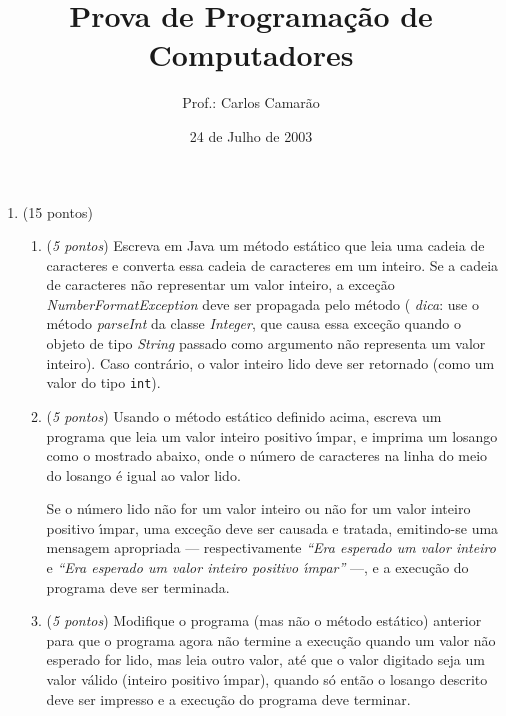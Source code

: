 \documentclass[brazil]{article}
\title{Prova de Programa\c{c}\~ao de Computadores}
\author{Prof.: Carlos Camar\~ao}
\date{24 de Julho de 2003}
\begin{document}
\maketitle

\newcommand{\prog}[1]{{\tt \begin{tabbing}
                        #1 \end{tabbing} }}
\begin{enumerate}

\item (15 pontos)

\begin{enumerate}

 \item ({\it 5 pontos\/}) Escreva em Java um m\'etodo est\'atico que
 leia uma cadeia de ca\-rac\-teres e converta essa cadeia de
 caracteres em um inteiro.  Se a cadeia de caracteres n\~ao
 representar um valor inteiro, a exce\c{c}\~ao {\it
 NumberFormatException\/} deve ser propagada pelo m\'etodo ({\em
 dica\/}: use o m\'etodo {\it parseInt\/} da classe {\it Integer\/},
 que causa essa exce\c{c}\~ao quando o objeto de tipo {\it String\/}
 passado como argumento n\~ao representa um valor inteiro). Caso
 contr\'ario, o valor inteiro lido deve ser retornado (como um valor
 do tipo {\tt int}).

 \item ({\it 5 pontos\/}) Usando o m\'etodo est\'atico definido acima,
 escreva um programa que leia um valor inteiro positivo \'{\i}mpar, e
 imprima um losango como o mostrado abaixo, onde o n\'umero de
 caracteres {\tt *} na linha do meio do losango \'e igual ao valor
 lido.

 Se o n\'umero lido n\~ao for um valor inteiro ou n\~ao for um valor
 inteiro positivo \'{\i}mpar, uma exce\c{c}\~ao deve ser causada e
 tratada, emitindo-se uma mensagem apropriada --- respectivamente {\em
 ``Era esperado um valor inteiro\/} e {\em ``Era espe\-ra\-do um valor
 inteiro positivo {\'{\i}mpar\/}''\/} ---, e a execu\c{c}\~ao do
 programa deve ser terminada.

 \item ({\it 5 pontos\/}) Modifique o programa (mas n\~ao o m\'etodo
 est\'atico) anterior para que o programa agora n\~ao termine a
 execu\c{c}\~ao quando um valor n\~ao esperado for lido, mas leia
 outro valor, at\'e que o valor digitado seja um valor v\'alido
 (inteiro positivo \'{\i}mpar), quando s\'o ent\~ao o losango descrito
 deve ser impresso e a execu\c{c}\~ao do programa deve terminar.


\end{enumerate}
\end{enumerate}
\end{document}
